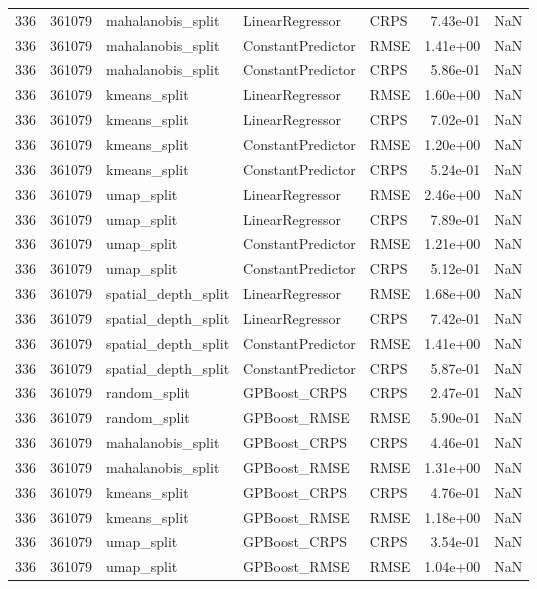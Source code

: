 \begin{tabular}{rrlllrr}
336 & 361079 & mahalanobis\_split & LinearRegressor & CRPS & 7.43e-01 & NaN \\
336 & 361079 & mahalanobis\_split & ConstantPredictor & RMSE & 1.41e+00 & NaN \\
336 & 361079 & mahalanobis\_split & ConstantPredictor & CRPS & 5.86e-01 & NaN \\
336 & 361079 & kmeans\_split & LinearRegressor & RMSE & 1.60e+00 & NaN \\
336 & 361079 & kmeans\_split & LinearRegressor & CRPS & 7.02e-01 & NaN \\
336 & 361079 & kmeans\_split & ConstantPredictor & RMSE & 1.20e+00 & NaN \\
336 & 361079 & kmeans\_split & ConstantPredictor & CRPS & 5.24e-01 & NaN \\
336 & 361079 & umap\_split & LinearRegressor & RMSE & 2.46e+00 & NaN \\
336 & 361079 & umap\_split & LinearRegressor & CRPS & 7.89e-01 & NaN \\
336 & 361079 & umap\_split & ConstantPredictor & RMSE & 1.21e+00 & NaN \\
336 & 361079 & umap\_split & ConstantPredictor & CRPS & 5.12e-01 & NaN \\
336 & 361079 & spatial\_depth\_split & LinearRegressor & RMSE & 1.68e+00 & NaN \\
336 & 361079 & spatial\_depth\_split & LinearRegressor & CRPS & 7.42e-01 & NaN \\
336 & 361079 & spatial\_depth\_split & ConstantPredictor & RMSE & 1.41e+00 & NaN \\
336 & 361079 & spatial\_depth\_split & ConstantPredictor & CRPS & 5.87e-01 & NaN \\
336 & 361079 & random\_split & GPBoost\_CRPS & CRPS & 2.47e-01 & NaN \\
336 & 361079 & random\_split & GPBoost\_RMSE & RMSE & 5.90e-01 & NaN \\
336 & 361079 & mahalanobis\_split & GPBoost\_CRPS & CRPS & 4.46e-01 & NaN \\
336 & 361079 & mahalanobis\_split & GPBoost\_RMSE & RMSE & 1.31e+00 & NaN \\
336 & 361079 & kmeans\_split & GPBoost\_CRPS & CRPS & 4.76e-01 & NaN \\
336 & 361079 & kmeans\_split & GPBoost\_RMSE & RMSE & 1.18e+00 & NaN \\
336 & 361079 & umap\_split & GPBoost\_CRPS & CRPS & 3.54e-01 & NaN \\
336 & 361079 & umap\_split & GPBoost\_RMSE & RMSE & 1.04e+00 & NaN \\

\end{tabular}
